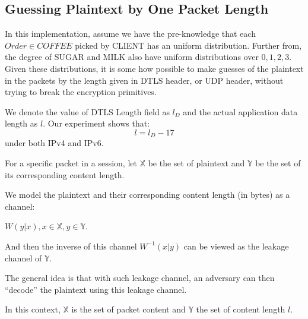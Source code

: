 \subsection{Guessing Plaintext by One Packet Length} \label{Sec: Guessing Plaintext by One Packet Length}
In this implementation, assume we have the pre-knowledge that each $Order \in COFFEE$ picked by CLIENT has an uniform distribution. Further from, the degree of SUGAR and MILK also have uniform distributions over ${0,1,2,3}$. Given these distributions, it is some how possible to make guesses of the plaintext in the packets by the length given in DTLS header, or UDP header, without trying to break the encryption primitives.

We denote the value of DTLS Length field as $l_D$ and the actual application data length as $l$. Our experiment shows that:
\begin{equation}
l = l_D - 17 \label{Eq: Plaintext length}
\end{equation}
under both IPv4 and IPv6.

\begin{definition}
For a specific packet in a session, let $\mathbb{X}$ be the set of plaintext and $\mathbb{Y}$ be the set of its corresponding content length.

 We model the plaintext  and their corresponding content length (in bytes) as a channel: 
 \begin{center}
 $W(y|x), x \in \mathbb{X}, y \in \mathbb{Y}$.
 \end{center}

And then the inverse of this channel $W^{-1}(x|y)$ can be viewed as the leakage channel of $\mathbb{Y}$.
\end{definition}

The general idea is that with such leakage channel, an adversary can then “decode” the plaintext using this leakage channel.

In this context, $\mathbb{X}$ is the set of packet content and $\mathbb{Y}$ the set of content length $l$.

